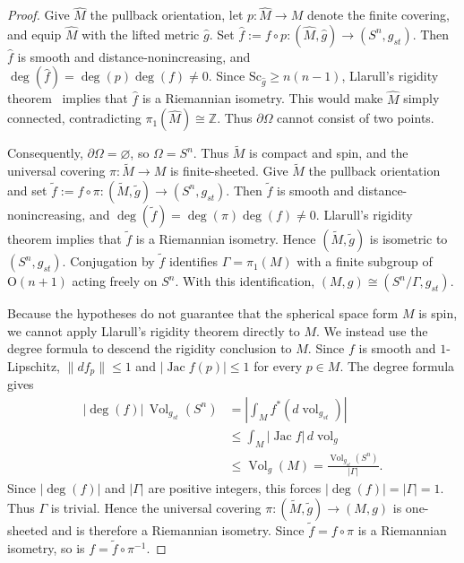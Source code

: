 \documentclass[12pt,oneside,a4paper]{article}
\theoremstyle{mytheorem}
\theoremstyle{remark}
\theoremstyle{definition}
\begin{document}
\begin{proof}
Give \(\widehat M\) the pullback orientation, let
\(p\colon\widehat M\to M\) denote the finite covering, and equip
\(\widehat M\) with the lifted metric \(\widehat g\). Set
\(\widehat f:=f\circ p\colon(\widehat M,\widehat g)
\to (S^n,g_{st})\).
Then \(\widehat f\) is smooth and distance-nonincreasing, and
\(
\deg(\widehat f)=\deg(p)\deg(f)\neq0.
\)
Since \(\mathrm{Sc}_{\widehat g}\geq n(n-1)\), Llarull's rigidity
theorem~\cite{MR1600027} implies that \(\widehat f\) is a Riemannian
isometry. This would make
\(\widehat M\) simply connected, contradicting
\(\pi_1(\widehat M)\cong\mathbb Z\). Thus \(\partial\Omega\) cannot
consist of two points.

Consequently, $\partial\Omega=\varnothing$, so $\Omega=S^n$. Thus
$\widetilde M$ is compact and spin, and the universal covering
\(\pi\colon\widetilde M\to M\) is finite-sheeted. Give
\(\widetilde M\) the pullback orientation and set
\(\widetilde f:=f\circ\pi\colon(\widetilde M,\tilde g)
\to (S^n,g_{st})\).
Then \(\widetilde f\) is smooth and distance-nonincreasing, and
\(
\deg(\widetilde f)=\deg(\pi)\deg(f)\neq0.
\)
Llarull's rigidity theorem implies that
\(\widetilde f\) is a Riemannian isometry. Hence
\((\widetilde M,\tilde g)\) is isometric to \((S^n,g_{st})\).
Conjugation by $\widetilde f$ identifies $\Gamma=\pi_1(M)$ with a finite
subgroup of $\mathrm{O}(n+1)$ acting freely on $S^n$. With this
identification,
$(M,g)\cong(S^n/\Gamma,g_{st})$.

Because the hypotheses do not guarantee that the spherical space form \(M\)
is spin, we cannot apply Llarull's rigidity theorem directly to \(M\). We
instead use the degree formula to descend the rigidity conclusion to $M$.
Since $f$ is smooth and $1$-Lipschitz,
\(\|df_p\|\leq1\) and \(|\operatorname{Jac}f(p)|\leq1\)
for every \(p\in M\).
The degree formula gives
\[
\begin{aligned}
|\deg(f)|\,\operatorname{Vol}_{g_{st}}(S^n)
&=
\left|\int_M f^*(d\operatorname{vol}_{g_{st}})\right| \\
&\leq
\int_M|\operatorname{Jac}f|\,d\operatorname{vol}_g \\
&\leq
\operatorname{Vol}_g(M)
=\frac{\operatorname{Vol}_{g_{st}}(S^n)}{|\Gamma|}.
\end{aligned}
\]
Since $|\deg(f)|$ and $|\Gamma|$ are positive integers, this forces
\(
|\deg(f)|=|\Gamma|=1.
\)
Thus \(\Gamma\) is trivial. Hence the universal covering
\(\pi\colon(\widetilde M,\tilde g)\to(M,g)\) is one-sheeted and is
therefore a Riemannian isometry. Since
\(\widetilde f=f\circ\pi\) is a Riemannian isometry, so is
\(f=\widetilde f\circ\pi^{-1}\).
\end{proof}
\end{document}
